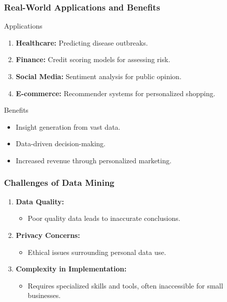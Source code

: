 \documentclass[aspectratio=169]{beamer}
\begin{document}
\begin{frame}[fragile]
    \frametitle{Real-World Applications and Benefits}
    \begin{block}{Applications}
        \begin{enumerate}
            \item \textbf{Healthcare:} Predicting disease outbreaks.
            \item \textbf{Finance:} Credit scoring models for assessing risk.
            \item \textbf{Social Media:} Sentiment analysis for public opinion.
            \item \textbf{E-commerce:} Recommender systems for personalized shopping.
        \end{enumerate}
    \end{block}
    
    \begin{block}{Benefits}
        \begin{itemize}
            \item Insight generation from vast data.
            \item Data-driven decision-making.
            \item Increased revenue through personalized marketing.
        \end{itemize}
    \end{block}
\end{frame}

\begin{frame}[fragile]
    \frametitle{Challenges of Data Mining}
    \begin{enumerate}
        \item \textbf{Data Quality:}
        \begin{itemize}
            \item Poor quality data leads to inaccurate conclusions.
        \end{itemize}
        
        \item \textbf{Privacy Concerns:}
        \begin{itemize}
            \item Ethical issues surrounding personal data use.
        \end{itemize}
        
        \item \textbf{Complexity in Implementation:}
        \begin{itemize}
            \item Requires specialized skills and tools, often inaccessible for small businesses.
        \end{itemize}
    \end{enumerate}
\end{frame}
\end{document}
